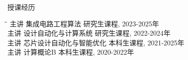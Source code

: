 \begin{rSection}{授课经历}

\begin{tabbing}
\hspace{1.5in}\= \hspace{3.4in}\= \kill
主讲 \> 集成电路工程算法 \> { 研究生课程, 2023-2025年 } \\
主讲 \> 设计自动化与计算系统 \> { 研究生课程, 2022-2024年} \\
主讲 \> 芯片设计自动化与智能优化 \> { 本科生课程, 2021-2025年 } \\
主讲 \> 计算概论B \> { 本科生课程, 2020-2022年 } \\
\end{tabbing}

\end{rSection}

